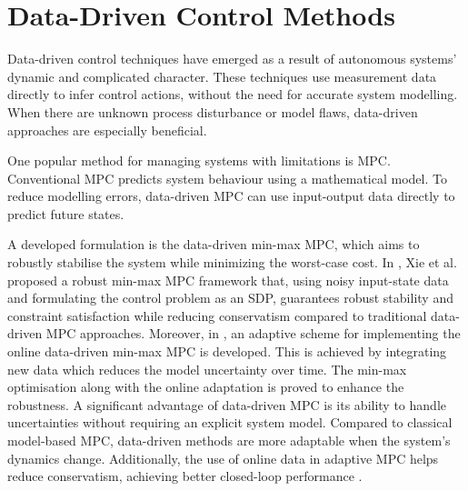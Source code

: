 \section{Data-Driven Control Methods}

Data-driven control techniques have emerged as a result of autonomous systems' dynamic and complicated character. These techniques use measurement data directly to infer control actions, without the need for accurate system modelling. When there are unknown process disturbance or model flaws, data-driven approaches are especially beneficial.

One popular method for managing systems with limitations is MPC. Conventional MPC predicts system behaviour using a mathematical model. To reduce modelling errors, data-driven MPC can use input-output data directly to predict future states.

A developed formulation is the data-driven min-max MPC, which aims to robustly stabilise the system while minimizing the worst-case cost. In \cite{xie2024}, Xie et al. proposed a robust min-max MPC framework that, using noisy input-state data and formulating the control problem as an SDP, guarantees robust stability and constraint satisfaction while reducing conservatism compared to traditional data-driven MPC approaches. Moreover, in \cite{xie2024robust}, an adaptive scheme for implementing the online data-driven min-max MPC is developed. This is achieved by integrating new data which reduces the model uncertainty over time. The min-max optimisation along with the online adaptation is proved to enhance the robustness.
A significant advantage of data-driven MPC is its ability to handle uncertainties without requiring an explicit system model. Compared to classical model-based MPC, data-driven methods are more adaptable when the system's dynamics change. Additionally, the use of online data in adaptive MPC helps reduce conservatism, achieving better closed-loop performance \cite{xie2024}.

